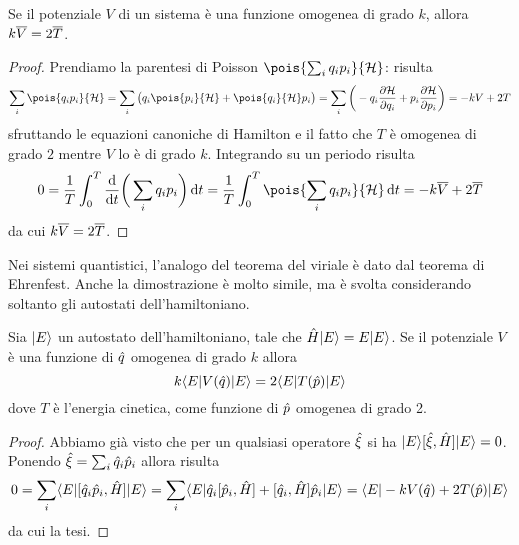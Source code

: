 \begin{teorema} \label{t:viriale}
	Se il potenziale $V$ di un sistema è una funzione omogenea di grado $k$, allora $k\overline{V}=2\overline{T}$.
\end{teorema}
\begin{proof}
	Prendiamo la parentesi di Poisson $\pois{\sum_iq_ip_i}{\ham}$: risulta
	\begin{equation}
		\sum_i\pois{q_ip_i}{\ham}=\sum_i\big(q_i\pois{p_i}{\ham}+\pois{q_i}{\ham}p_i\big)=\sum_i\bigg(-q_i\drp{\ham}{q_i}+p_i\drp{\ham}{p_i}\bigg)=-kV+2T
	\end{equation}
	sfruttando le equazioni canoniche di Hamilton e il fatto che $T$ è omogenea di grado $2$ mentre $V$ lo è di grado $k$.
	Integrando su un periodo risulta
	\begin{equation}
		0=\frac1{T}\int_0^T\drv{}{t}\bigg(\sum_iq_ip_i\bigg)\,\dd t=\frac1{T}\int_0^T\pois{\sum_iq_ip_i}{\ham}\,\dd t=-k\avg{V}+2\avg{T}
	\end{equation}
	da cui $k\overline{V}=2\overline{T}$.
\end{proof}

Nei sistemi quantistici, l'analogo del teorema del viriale è dato dal teorema di Ehrenfest.
Anche la dimostrazione è molto simile, ma è svolta considerando soltanto gli autostati dell'hamiltoniano.
\begin{teorema}[Ehrenfest] \label{t:ehrenfest}
	Sia $\lvert E\rangle$ un autostato dell'hamiltoniano, tale che $\hat{H}\lvert E\rangle=E\lvert E\rangle$.
	Se il potenziale $V$ è una funzione di $\hat{q}$ omogenea di grado $k$ allora
	\begin{equation}
		k\langle E\rvert V(\hat{q})\lvert E\rangle=2\langle E\rvert T(\hat{p})\lvert E\rangle
		\label{eq:ehrenfest}
	\end{equation}
	dove $T$ è l'energia cinetica, come funzione di $\hat{p}$ omogenea di grado 2.
\end{teorema}
\begin{proof}
	Abbiamo già visto che per un qualsiasi operatore $\hat{\xi}$ si ha $\lvert E\rangle[\hat{\xi},\hat{H}]\lvert E\rangle=0$.
	Ponendo $\hat{\xi}=\sum_i\hat{q}_i\hat{p}_i$ allora risulta
	\begin{equation}
		0=\sum_i\langle E\rvert[\hat{q}_i\hat{p}_i,\hat{H}]\lvert E\rangle=\sum_i\langle E\rvert\hat{q}_i[\hat{p}_i,\hat{H}]+[\hat{q}_i,\hat{H}]\hat{p}_i\lvert E\rangle=\langle E\rvert-kV(\hat{q})+2T(\hat{p})\lvert E\rangle
	\end{equation}
	da cui la tesi.
\end{proof}

